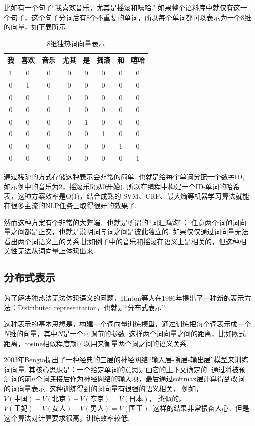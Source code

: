 \documentclass[bachelor,adobefonts]{jnuthesis}
\begin{document}
比如有一个句子“我喜欢音乐，尤其是摇滚和嘻哈.”
如果整个语料库中就仅有这一个句子，这个句子分词后有8个不重复的单词，所以每个单词都可以表示为一个8维的向量，如下表所示.

\begin{table}[h!]
  \centering
  \begin{tabular}{cccccccc}
    \toprule
    \textbf{我} & \textbf{喜欢} & \textbf{音乐} & \textbf{尤其} & \textbf{是} & \textbf{摇滚}  & \textbf{和} & \textbf{嘻哈}  \\
    \midrule
    1 & 0 & 0 & 0 & 0 & 0 & 0 & 0 \\
    0 & 1 & 0 & 0 & 0 & 0 & 0 & 0 \\
    0 & 0 & 1 & 0 & 0 & 0 & 0 & 0 \\
    0 & 0 & 0 & 1 & 0 & 0 & 0 & 0 \\
    0 & 0 & 0 & 0 & 1 & 0 & 0 & 0 \\
    0 & 0 & 0 & 0 & 0 & 1 & 0 & 0 \\
    0 & 0 & 0 & 0 & 0 & 0 & 1 & 0 \\
    0 & 0 & 0 & 0 & 0 & 0 & 0 & 1 \\
    \bottomrule
  \end{tabular}
  \caption{8维独热词向量表示}\label{table:3t1}
\end{table}

通过稀疏的方式存储这种表示会非常的简单.
也就是给每个单词分配一个数字ID,如示例中的音乐为2，摇滚乐5(从0开始).
所以在编程中构建一个ID-单词的哈希表，这种方案效率是O(1)，结合成熟的
SVM、CRF、最大熵等机器学习算法就能在很多主流的NLP任务上取得很好的效果了.

然而这种方案有个非常的大弊端，也就是所谓的“词汇鸿沟”：
任意两个词的词向量之间都是正交，也就是说明词与词之间是彼此独立的.
如果仅仅通过词向量无法看出两个词语义上的关系.比如例子中的音乐和摇滚在语义上是相关的，但这种相关性无法从词向量上体现出来.

\subsection{分布式表示}
为了解决独热法无法体现语义的问题，Hinton等人\cite{Rumelhart1986Learning}在1986年提出了一种新的表示方法：Distributed representation，也就是“分布式表示”.

这种表示的基本思想是，构建一个词向量训练模型，通过训练把每个词表示成一个$N$维的向量，其中$N$是一个可调节的参数.
这样两个词向量之间的距离，比如欧式距离，cosine相似程度就可以用来衡量两个词之间的语义关系.

2003年Bengio\cite{Turian2010Word}提出了一种经典的三层的神经网络“输入层-隐层-输出层”模型来训练词向量.
其核心思想是：一个给定单词的意思是由它的上下文确定的.
通过将被预测词的前$n$个词连接后作为神经网络的输入项，最后通过softmax层计算得到改词的词向量表示.
这种训练得到的词向量有很强的语义相关，
例如，$V(\mbox{中国})-V(\mbox{北京})+V(\mbox{东京}) = V(\mbox{日本})$，
类似的，$V(\mbox{王妃})-V(\mbox{女人})+V(\mbox{男人})=V(\mbox{国王})$.
这样的结果非常振奋人心，但是这个算法对计算要求很高，训练效率较低.
\end{document}
